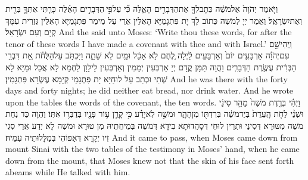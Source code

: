 {וַיֹּ֤אמֶר יְהֹוָה֙ אֶל\maqqaf מֹשֶׁ֔ה כְּתׇב\maqqaf לְךָ֖ אֶת\maqqaf הַדְּבָרִ֣ים הָאֵ֑לֶּה כִּ֞י עַל\maqqaf פִּ֣י \legarmeh  הַדְּבָרִ֣ים הָאֵ֗לֶּה כָּרַ֧תִּי אִתְּךָ֛ בְּרִ֖ית וְאֶת\maqqaf יִשְׂרָאֵֽל׃}
{וַאֲמַר יְיָ לְמֹשֶׁה כְּתוֹב לָךְ יָת פִּתְגָמַיָּא הָאִלֵּין אֲרֵי עַל מֵימַר פִּתְגָמַיָּא הָאִלֵּין גְּזַרִית עִמָּךְ קְיָם וְעִם יִשְׂרָאֵל׃}
{And the \lord\space said unto Moses: ‘Write thou these words, for after the tenor of these words I have made a covenant with thee and with Israel.’}{}
{וַֽיְהִי\maqqaf שָׁ֣ם עִם\maqqaf יְהֹוָ֗ה אַרְבָּעִ֥ים יוֹם֙ וְאַרְבָּעִ֣ים לַ֔יְלָה לֶ֚חֶם לֹ֣א אָכַ֔ל וּמַ֖יִם לֹ֣א שָׁתָ֑ה וַיִּכְתֹּ֣ב עַל\maqqaf הַלֻּחֹ֗ת אֵ֚ת דִּבְרֵ֣י הַבְּרִ֔ית עֲשֶׂ֖רֶת הַדְּבָרִֽים׃}
{וַהֲוָה תַּמָּן קֳדָם יְיָ אַרְבְּעִין יְמָמִין וְאַרְבְּעִין לֵילָוָן לַחְמָא לָא אֲכַל וּמַיָּא לָא שְׁתִי וּכְתַב עַל לוּחַיָּא יָת פִּתְגָמֵי קְיָמָא עֶשְׂרָא פִּתְגָמִין׃}
{And he was there with the \lord\space forty days and forty nights; he did neither eat bread, nor drink water. And he wrote upon the tables the words of the covenant, the ten words.}{}
{וַיְהִ֗י בְּרֶ֤דֶת מֹשֶׁה֙ מֵהַ֣ר סִינַ֔י וּשְׁנֵ֨י לֻחֹ֤ת הָֽעֵדֻת֙ בְּיַד\maqqaf מֹשֶׁ֔ה בְּרִדְתּ֖וֹ מִן\maqqaf הָהָ֑ר וּמֹשֶׁ֣ה לֹֽא\maqqaf יָדַ֗ע כִּ֥י קָרַ֛ן ע֥וֹר פָּנָ֖יו בְּדַבְּר֥וֹ אִתּֽוֹ׃}
{וַהֲוָה כַּד נְחַת מֹשֶׁה מִטּוּרָא דְּסִינַי וּתְרֵין לוּחֵי דְּסָהֲדוּתָא בִּידָא דְּמֹשֶׁה בְּמֵיחֲתֵיהּ מִן טוּרָא וּמֹשֶׁה לָא יְדַע אֲרֵי סְגִי זִיו יְקָרָא דְּאַפּוֹהִי בְּמַלָּלוּתֵיהּ עִמֵּיהּ׃}
{And it came to pass, when Moses came down from mount Sinai with the two tables of the testimony in Moses’ hand, when he came down from the mount, that Moses knew not that the skin of his face sent forth abeams while He talked with him.}{}
